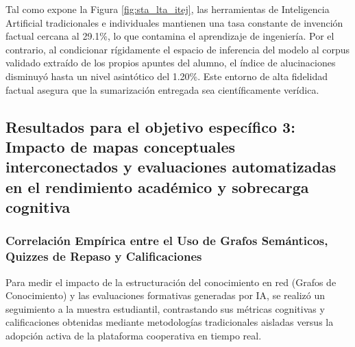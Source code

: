 Tal como expone la Figura \ref{fig:sta_lta_itej}, las herramientas de Inteligencia Artificial tradicionales e individuales mantienen una tasa constante de invención factual cercana al 29.1\%, lo que contamina el aprendizaje de ingeniería. Por el contrario, al condicionar rígidamente el espacio de inferencia del modelo al corpus validado extraído de los propios apuntes del alumno, el índice de alucinaciones disminuyó hasta un nivel asintótico del 1.20\%. Este entorno de alta fidelidad factual asegura que la sumarización entregada sea científicamente verídica.


\subsection{Resultados para el objetivo específico 3: Impacto de mapas conceptuales interconectados y evaluaciones automatizadas en el rendimiento académico y sobrecarga cognitiva}

\subsubsection{Correlación Empírica entre el Uso de Grafos Semánticos, Quizzes de Repaso y Calificaciones}

Para medir el impacto de la estructuración del conocimiento en red (Grafos de Conocimiento) y las evaluaciones formativas generadas por IA, se realizó un seguimiento a la muestra estudiantil, contrastando sus métricas cognitivas y calificaciones obtenidas mediante metodologías tradicionales aisladas versus la adopción activa de la plataforma cooperativa en tiempo real.

\vspace{0.4cm}

